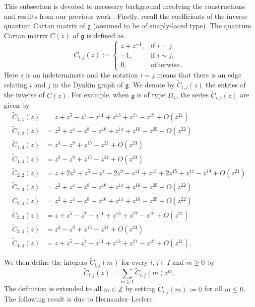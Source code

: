 \documentclass[12pt]{amsart}
\theoremstyle{plain}
\theoremstyle{definition}
\numberwithin{equation}{section}
\begin{document}
 This subsection is devoted to necessary background involving  the constructions and results from our previous work \cite{CasbiLi}. Firstly, recall the coefficients of the inverse quantum Cartan matrix of $\mathfrak{g}$ (assumed to be of simply-laced type). The quantum Cartan matrix $C(z)$ of $\mathfrak{g}$ is defined as 
 $$ C_{i,j}(z) := 
 \begin{cases}
     z+z^{-1}, & \text{if $i=j$,} \\
     -1, & \text{if $i \sim j$,} \\
     0, & \text{otherwise.}
 \end{cases}
 $$
Here $z$ is an indeterminate and the notation $i \sim j$ means that there is an edge relating $i$ and $j$ in the Dynkin graph of $\mathfrak{g}$. We denote by $\widetilde{C}_{i,j}(z)$ the entries of the inverse of $C(z)$. For example, when $\mathfrak{g}$ is of type $D_4$, the series $\widetilde{C}_{i,j}(z)$ are given by
\begin{align*}
\widetilde{C}_{1,1}(z) &= z + z^5 - z^7 - z^{11} + z^{13} + z^{17} - z^{19} + O(z^{21}) \\
\widetilde{C}_{1,2}(z) &= z^2 + z^4 - z^8 - z^{10} + z^{14} + z^{16} - z^{20} + O(z^{22}) \\
\widetilde{C}_{1,3}(z) &= z^3 - z^9 + z^{15} - z^{21} + O(z^{23}) \\
\widetilde{C}_{1,4}(z) &= z^3 - z^9 + z^{15} - z^{21} + O(z^{23}) \\
\widetilde{C}_{2,2}(z) &= z + 2 z^3 + z^5 - z^7 - 2 z^9 - z^{11} + z^{13} + 2 z^{15} + z^{17} - z^{19} + O(z^{21}) \\
\widetilde{C}_{2,3}(z) &= z^2 + z^4 - z^8 - z^{10} + z^{14} + z^{16} - z^{20} + O(z^{22}) \\
\widetilde{C}_{2,4}(z) &= z^2 + z^4 - z^8 - z^{10} + z^{14} + z^{16} - z^{20} + O(z^{22}) \\
\widetilde{C}_{3,3}(z) &= z + z^5 - z^7 - z^{11} + z^{13} + z^{17} - z^{19} + O(z^{21}) \\
\widetilde{C}_{3,4}(z) &= z^3 - z^9 + z^{15} - z^{21} + O(z^{23}) \\
\widetilde{C}_{4,4}(z) &= z + z^5 - z^7 - z^{11} + z^{13} + z^{17} - z^{19} + O(z^{21}). 
\end{align*}

We then define the integers $\widetilde{C}_{i,j}(m)$ for every $i,j \in I$ and $m \geq 0$ by 
$$ \widetilde{C}_{i,j}(z) = \sum_{m \geq 1} \widetilde{C}_{i,j}(m)z^m .$$
The definition is extended to all $m \in \mathbb{Z}$ by setting $\widetilde{C}_{i,j}(m) := 0$ for all $m \leq 0$. The following result is due to Hernandez--Leclerc \cite{HL15}.
\end{document}
